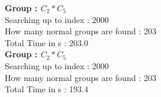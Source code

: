 \textbf{Group : $C_2*C_5$}\\
Searching up to index : 2000\\
How many normal groups are found : 203\\
Total Time in s : 203.0\\
\textbf{Group : $C_2*C_5$}\\
Searching up to index : 2000\\
How many normal groups are found : 203\\
Total Time in s : 193.4\\
